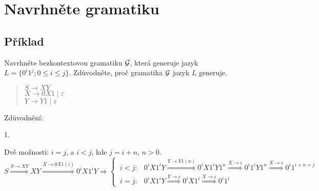 \begin{multicols}{2}
        
        
\end{multicols}  

\section*{Navrhněte gramatiku}
\subsection{Příklad}
    \noindent
    Navrhněte bezkontextovou gramatiku $\mathcal{G}$, která generuje jazyk $L = \{0^i1^j ; 0 \leq i \leq j\}$.
    Zdůvodněte, proč gramatika $\mathcal{G}$ jazyk $L$ generuje.
    
    \begin{quote}
    $S \rightarrow XY$\\
    $X \rightarrow 0X1 \mid \varepsilon$\\
    $Y \rightarrow Y1 \mid \varepsilon$\\
\end{quote}

Zdůvodnění: 

1. 

Dvě možnosti: $ i = j$, a $i < j$, kde $j = i + n$, $n > 0$. 
\[
    S \stackrel{S \rightarrow XY}{\Longrightarrow} XY \stackrel{X \rightarrow 0X1 (i)}{\Longrightarrow} 0^i X 1^i Y  
    \Longrightarrow
\begin{cases}
    \ i < j:  & 0^i X 1^i Y \stackrel {Y \rightarrow Y1 (n)}{\Longrightarrow} 0^i X 1^i Y 1^n \stackrel{X \rightarrow 
    \varepsilon}{\Longrightarrow}0^i 1^i Y 1^n \stackrel{X \rightarrow \varepsilon}{\Longrightarrow} 0^i 1^{i+n = j} \\
    \ i = j: & 0^i X 1^i Y \stackrel{Y \rightarrow \varepsilon}{\Longrightarrow} 0^i X 1^i \stackrel{X \rightarrow 
    \varepsilon}{\Longrightarrow} 0^i 1^i
\end{cases}
\]

